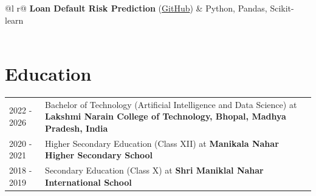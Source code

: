 \documentclass[a4paper,12pt]{article}
\begin{document}
\begin{tabularx}{\linewidth}{ @{}l r@{} }
\textbf{Loan Default Risk Prediction} \normalsize{(\href{https://github.com/Rider-04/bank-loan-default-risk-analysis}{GitHub})} & \hfill \normalsize{Python, Pandas, Scikit-learn} \\[3.75pt]
 \\
\end{tabularx}

\vspace{10pt}


\section{Education}
\begin{tabularx}{\linewidth}{@{}l X@{}}
2022 - 2026 & Bachelor of Technology (Artificial Intelligence and Data Science) at \textbf{Lakshmi Narain College of Technology, Bhopal, Madhya Pradesh, India} \hfill  \\[12pt]
2020 - 2021 & Higher Secondary Education (Class XII) at \textbf{Manikala Nahar Higher Secondary School} \hfill  \\[12pt]
2018 - 2019 & Secondary Education (Class X) at \textbf{Shri Maniklal Nahar International School} \hfill  \\
\end{tabularx}
\end{document}
